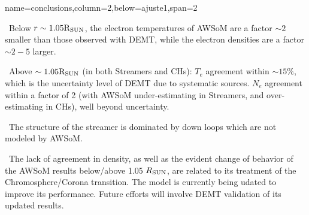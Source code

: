\documentclass[paperwidth=100cm,paperheight=120cm]{baposter}
\def\bu{\textcolor{red}{\textbullet~}}
\def\bu{\textcolor{red}{\textbullet~}}
\begin{document}
\begin{poster}
{{}
}

{name=conclusions,column=2,below=ajuste1,span=2}{
{\footnotesize\sf
\bu Below $r \sim 1.05 {\rm R_{SUN}}$, the electron temperatures of AWSoM are a factor $\sim 2$ smaller than those observed with DEMT, while the electron densities are a factor $\sim 2-5$ larger.

\bu Above $\sim 1.05 {\rm R_{SUN}}$ (in both Streamers and CHs): $T_e$ agreement within $\sim 15 \%$, which is the uncertainty level of DEMT due to systematic sources. $N_e$ agreement within a factor of 2 (with AWSoM under-estimating in Streamers, and over-estimating in CHs), well beyond uncertainty.

\bu The structure of the streamer is dominated by down loops which are not modeled by AWSoM.

\bu The lack of agreement in density, as well as the evident change of behavior of the AWSoM results below/above 1.05 $R_{\rm SUN}$, are related to its treatment of the Chromosphere/Corona transition. The model is currently being udated to improve its performance. Future efforts will involve DEMT validation of its updated results.

}
}

\end{poster}%
\end{document}
